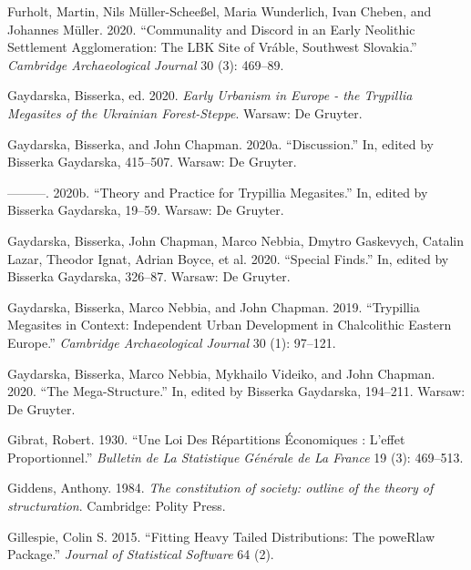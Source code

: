 \documentclass[
  12pt,
  a4paper, twoside]{book}
\newlength{\cslhangindent}
\newlength{\cslentryspacingunit} %
\newenvironment{CSLReferences}[2] %
 {%
  \setlength{\parindent}{0pt}
  \ifodd #1
  \let\oldpar\par
  \def\par{\hangindent=\cslhangindent\oldpar}
  \fi
  \setlength{\parskip}{#2\cslentryspacingunit}
 }%
 {}
\begin{document}
\begin{CSLReferences}{1}{0}
\leavevmode{}%
Furholt, Martin, Nils Müller-Scheeßel, Maria Wunderlich, Ivan Cheben, and Johannes Müller. 2020. {``Communality and Discord in an Early Neolithic Settlement Agglomeration: The LBK Site of Vráble, Southwest Slovakia.''} \emph{Cambridge Archaeological Journal} 30 (3): 469--89.

\leavevmode{}%
Gaydarska, Bisserka, ed. 2020. \emph{Early Urbanism in Europe - the Trypillia Megasites of the Ukrainian Forest-Steppe}. Warsaw: De Gruyter.

\leavevmode{}%
Gaydarska, Bisserka, and John Chapman. 2020a. {``Discussion.''} In, edited by Bisserka Gaydarska, 415--507. Warsaw: De Gruyter.

\leavevmode{}%
---------. 2020b. {``Theory and Practice for Trypillia Megasites.''} In, edited by Bisserka Gaydarska, 19--59. Warsaw: De Gruyter.

\leavevmode{}%
Gaydarska, Bisserka, John Chapman, Marco Nebbia, Dmytro Gaskevych, Catalin Lazar, Theodor Ignat, Adrian Boyce, et al. 2020. {``Special Finds.''} In, edited by Bisserka Gaydarska, 326--87. Warsaw: De Gruyter.

\leavevmode{}%
Gaydarska, Bisserka, Marco Nebbia, and John Chapman. 2019. {``Trypillia Megasites in Context: Independent Urban Development in Chalcolithic Eastern Europe.''} \emph{Cambridge Archaeological Journal} 30 (1): 97--121.

\leavevmode{}%
Gaydarska, Bisserka, Marco Nebbia, Mykhailo Videiko, and John Chapman. 2020. {``The Mega-Structure.''} In, edited by Bisserka Gaydarska, 194--211. Warsaw: De Gruyter.

\leavevmode{}%
Gibrat, Robert. 1930. {``Une Loi Des Répartitions Économiques : L'effet Proportionnel.''} \emph{Bulletin de La Statistique Générale de La France} 19 (3): 469--513.

\leavevmode{}%
Giddens, Anthony. 1984. \emph{The constitution of society: outline of the theory of structuration}. Cambridge: Polity Press.

\leavevmode{}%
Gillespie, Colin S. 2015. {``Fitting Heavy Tailed Distributions: The poweRlaw Package.''} \emph{Journal of Statistical Software} 64 (2).


\end{CSLReferences}
\end{document}
